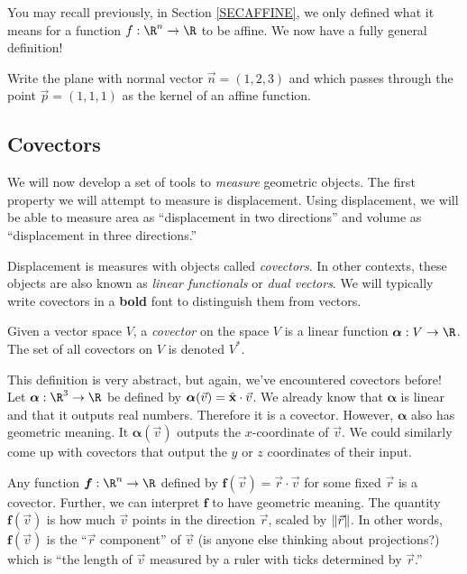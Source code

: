 You may recall previously, in Section \ref{SECAFFINE},
we only defined what it means for a function $f:\R^n\to \R$
to be affine.
We now have a fully general
definition!

\begin{exercise}
	Write the plane with normal vector $\vec n=(1,2,3)$ and which
	passes through the point $\vec p=(1,1,1)$ as the kernel of an 
	affine function.
\end{exercise}

\subsection{Covectors}

We will now develop
a set of tools to \emph{measure} geometric objects.  The first
property we will attempt to measure is displacement.  Using
displacement,
we will be able to measure area as ``displacement in two directions''
and volume as ``displacement in three directions.''

Displacement is measures with objects called \emph{covectors}.
In other contexts, these objects are also known as 
\emph{linear functionals} or \emph{dual vectors}.
We will typically write covectors in a \textbf{bold} font to  distinguish 
them from vectors.

\begin{definition}[Covector]
	Given a vector space $V$, a \emph{covector} on the space $V$
	is a linear function $\bm{\alpha}:V\to \R$.  The set of all
	covectors on $V$ is denoted $V^*$.
\end{definition}

This definition is very abstract, but again, we've encountered covectors
before!  Let $\bm{\alpha}:\R^3\to\R$ be defined by $\bm{\alpha}(\vec v) ={\hat {\mathbf x}} \cdot \vec v$.
We already know that $\bm{\alpha}$ is linear and that it outputs
real numbers.  Therefore it is a covector.  However, $\bm \alpha$ also has
geometric meaning.  It $\bm\alpha(\vec v)$ outputs the $x$-coordinate
of $\vec v$.  We could similarly come up with covectors that output the $y$ or $z$ coordinates
of their input.

Any function $\bm f:\R^n\to \R$ defined by $\bm f(\vec v) = \vec r\cdot \vec v$
for some fixed $\vec r$ is a covector.  Further, we can interpret
$\bm f$ to have geometric meaning.  The quantity $\bm f(\vec v)$ is how
much $\vec v$ points in the direction $\vec r$, scaled by $\lVert\vec r\rVert$.  
In other words, $\bm f(\vec v)$
is the ``$\vec r$ component'' of $\vec v$ (is anyone else thinking
about projections?) which is ``the length of $\vec v$ measured by a ruler
with ticks determined by $\vec r$.''


